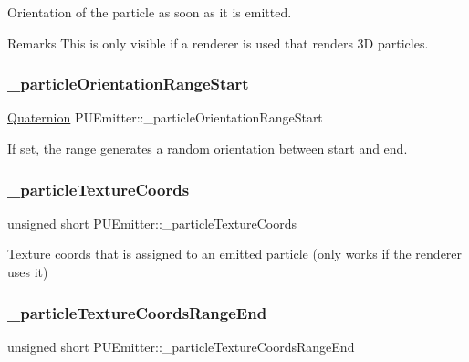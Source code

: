 Orientation of the particle as soon as it is emitted. \begin{DoxyRemark}{Remarks}
This is only visible if a renderer is used that renders 3D particles. 
\end{DoxyRemark}
\mbox{\label{classPUEmitter_aa2cc6ae3bf6edf47a76ac6787406ba79}} 
\subsubsection{\texorpdfstring{\+\_\+particle\+Orientation\+Range\+Start}{\_particleOrientationRangeStart}}
{\footnotesize\ttfamily \hyperlink{classQuaternion}{Quaternion} P\+U\+Emitter\+::\+\_\+particle\+Orientation\+Range\+Start\hspace{0.3cm}{\ttfamily [protected]}}

If set, the range generates a random orientation between start and end. \mbox{\label{classPUEmitter_a3f485e408d3555deaca841793bc2cbb5}} 
\subsubsection{\texorpdfstring{\+\_\+particle\+Texture\+Coords}{\_particleTextureCoords}}
{\footnotesize\ttfamily unsigned short P\+U\+Emitter\+::\+\_\+particle\+Texture\+Coords\hspace{0.3cm}{\ttfamily [protected]}}

Texture coords that is assigned to an emitted particle (only works if the renderer uses it) \mbox{\label{classPUEmitter_a027f5821bdf5361572eeec0718dbc917}} 
\subsubsection{\texorpdfstring{\+\_\+particle\+Texture\+Coords\+Range\+End}{\_particleTextureCoordsRangeEnd}}
{\footnotesize\ttfamily unsigned short P\+U\+Emitter\+::\+\_\+particle\+Texture\+Coords\+Range\+End\hspace{0.3cm}{\ttfamily [protected]}}

